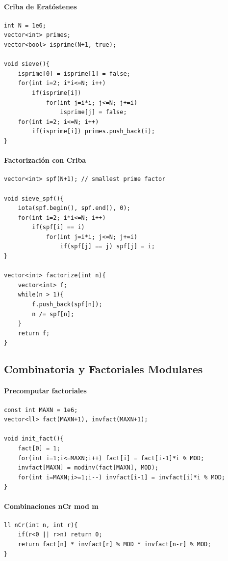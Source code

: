 \documentclass{article}
\begin{document}
\paragraph{Criba de Eratóstenes}
\begin{lstlisting}[style=cppstyle]
int N = 1e6;
vector<int> primes;
vector<bool> isprime(N+1, true);

void sieve(){
    isprime[0] = isprime[1] = false;
    for(int i=2; i*i<=N; i++)
        if(isprime[i])
            for(int j=i*i; j<=N; j+=i)
                isprime[j] = false;
    for(int i=2; i<=N; i++)
        if(isprime[i]) primes.push_back(i);
}
\end{lstlisting}

\paragraph{Factorización con Criba}
\begin{lstlisting}[style=cppstyle]
vector<int> spf(N+1); // smallest prime factor

void sieve_spf(){
    iota(spf.begin(), spf.end(), 0);
    for(int i=2; i*i<=N; i++)
        if(spf[i] == i)
            for(int j=i*i; j<=N; j+=i)
                if(spf[j] == j) spf[j] = i;
}

vector<int> factorize(int n){
    vector<int> f;
    while(n > 1){
        f.push_back(spf[n]);
        n /= spf[n];
    }
    return f;
}
\end{lstlisting}


\subsection{Combinatoria y Factoriales Modulares}

\paragraph{Precomputar factoriales}
\begin{lstlisting}[style=cppstyle]
const int MAXN = 1e6;
vector<ll> fact(MAXN+1), invfact(MAXN+1);

void init_fact(){
    fact[0] = 1;
    for(int i=1;i<=MAXN;i++) fact[i] = fact[i-1]*i % MOD;
    invfact[MAXN] = modinv(fact[MAXN], MOD);
    for(int i=MAXN;i>=1;i--) invfact[i-1] = invfact[i]*i % MOD;
}
\end{lstlisting}

\paragraph{Combinaciones nCr mod m}
\begin{lstlisting}[style=cppstyle]
ll nCr(int n, int r){
    if(r<0 || r>n) return 0;
    return fact[n] * invfact[r] % MOD * invfact[n-r] % MOD;
}
\end{lstlisting}
\end{document}

